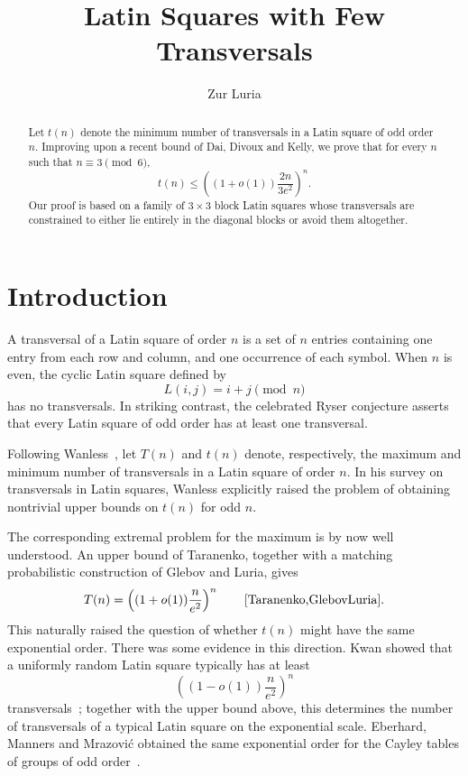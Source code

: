\documentclass[11pt]{article}
\title{Latin Squares with Few Transversals}
\author{Zur Luria}
\date{}
\theoremstyle{remark}
\newcommand{\1}{\mathbf 1}
\begin{document}
\maketitle
\vspace{-1.5em}

\begin{abstract}
Let $t(n)$ denote the minimum number of transversals in a Latin square of odd order $n$. Improving upon a recent bound of Dai, Divoux and Kelly, we prove that for every $n$ such that $n \equiv 3 \pmod 6$,
\[
t(n) \leq \left( \left(1+o(1)\right) \frac{2n}{3e^2}\right)^n .
\]
Our proof is based on a family of $3 \times 3$ block Latin squares whose transversals are constrained to either lie entirely in the diagonal blocks or avoid them altogether. 
\end{abstract}

\section{Introduction}

A transversal of a Latin square of order $n$ is a set of $n$ entries containing one entry from each row and column, and one occurrence of each symbol. When $n$ is even, the cyclic Latin square defined by
\[
L(i,j)=i+j\pmod n
\]
has no transversals. In striking contrast, the celebrated Ryser conjecture asserts that every Latin square of odd order has at least one transversal.

Following Wanless~\cite{WanlessSurvey}, let $T(n)$ and $t(n)$ denote, respectively, the maximum and minimum number of transversals in a Latin square of order $n$. In his survey on transversals in Latin squares, Wanless explicitly raised the problem of obtaining nontrivial upper bounds on $t(n)$ for odd $n$.

The corresponding extremal problem for the maximum is by now well understood. An upper bound of Taranenko, together with a matching probabilistic construction of Glebov and Luria, gives
\[
 T(n)=\left((1+o(1))\frac{n}{e^2}\right)^n
 \qquad\text{\cite{Taranenko,GlebovLuria}.}
\]
This naturally raised the question of whether $t(n)$ might have the same exponential order. There was some evidence in this direction. Kwan showed that a uniformly random Latin square typically has at least
\[
 \left((1-o(1))\frac{n}{e^2}\right)^n
\]
transversals~\cite{Kwan}; together with the upper bound above, this determines the number of transversals of a typical Latin square on the exponential scale. Eberhard, Manners and Mrazovi\'c obtained the same exponential order for the Cayley tables of groups of odd order~\cite{EMM}.
\end{document}
